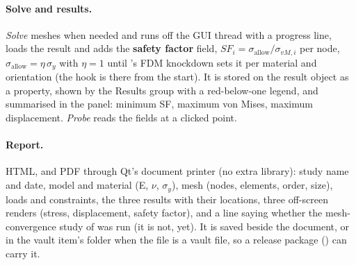 \paragraph{Solve and results.} \emph{Solve} meshes when needed and runs  off the GUI thread with a
progress line, loads the result and adds the \textbf{safety factor} field,
$SF_i=\sigma_{\text{allow}}/\sigma_{vM,i}$ per node, $\sigma_{\text{allow}}=\eta\,\sigma_y$ with $\eta=1$ until
's FDM knockdown sets it per material and orientation (the hook is there from the start). It is
stored on the result object as a \code{[BW]} property, shown by the Results group with a red-below-one legend,
and summarised in the panel: minimum SF, maximum von Mises, maximum displacement. \emph{Probe} reads the fields at a
clicked point.

\paragraph{Report.} HTML, and PDF through Qt's document printer (no extra library): study name and date, model
and material (E, $\nu$, $\sigma_y$), mesh (nodes, elements, order, size), loads and constraints, the three results
with their locations, three off-screen renders (stress, displacement, safety factor), and a line saying whether
the mesh-convergence study of  was run (it is not, yet). It is saved beside the document, or in the
vault item's folder when the file is a vault file, so a release package () can carry it.

